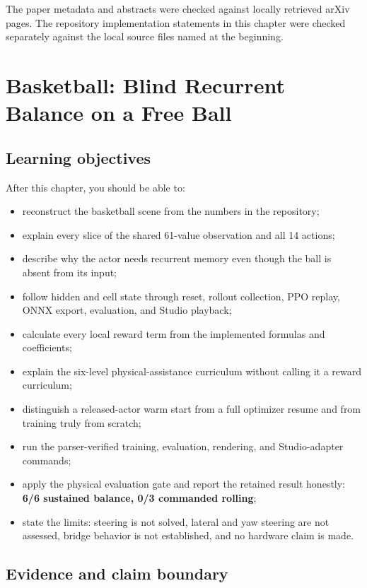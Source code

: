 \documentclass[
  american,
  11pt,
  letterpaper,
]{article}
\providecommand{\tightlist}{%
  \setlength{\itemsep}{0pt}\setlength{\parskip}{0pt}}
\begin{document}
The paper metadata and abstracts were checked against locally retrieved
arXiv pages. The repository implementation statements in this chapter
were checked separately against the local source files named at the
beginning.

\section{Basketball: Blind Recurrent Balance on a Free
Ball}\label{basketball-blind-recurrent-balance-on-a-free-ball}

\subsection{Learning objectives}\label{learning-objectives}

After this chapter, you should be able to:

\begin{itemize}
\tightlist
\item
  reconstruct the basketball scene from the numbers in the repository;
\item
  explain every slice of the shared 61-value observation and all 14
  actions;
\item
  describe why the actor needs recurrent memory even though the ball is
  absent from its input;
\item
  follow hidden and cell state through reset, rollout collection, PPO
  replay, ONNX export, evaluation, and Studio playback;
\item
  calculate every local reward term from the implemented formulas and
  coefficients;
\item
  explain the six-level physical-assistance curriculum without calling
  it a reward curriculum;
\item
  distinguish a released-actor warm start from a full optimizer resume
  and from training truly from scratch;
\item
  run the parser-verified training, evaluation, rendering, and
  Studio-adapter commands;
\item
  apply the physical evaluation gate and report the retained result
  honestly: \textbf{6/6 sustained balance, 0/3 commanded rolling};
\item
  state the limits: steering is not solved, lateral and yaw steering are
  not assessed, bridge behavior is not established, and no hardware
  claim is made.
\end{itemize}

\subsection{Evidence and claim
boundary}\label{evidence-and-claim-boundary}
\end{document}
